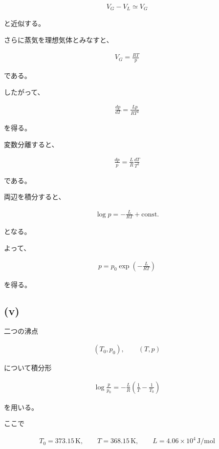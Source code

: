 \documentclass[platex,dvipdfmx,a4paper]{jsarticle}
\begin{document}
\begin{align*}
V_G-V_L
\simeq
V_G
\end{align*}

と近似する。

さらに蒸気を理想気体とみなすと、

\begin{align*}
V_G
=
\frac{RT}{p}
\end{align*}

である。

したがって、

\begin{align*}
\frac{dp}{dT}
=
\frac{Lp}{RT^2}
\end{align*}

を得る。

変数分離すると、

\begin{align*}
\frac{dp}{p}
=
\frac{L}{R}
\frac{dT}{T^2}
\end{align*}

である。

両辺を積分すると、

\begin{align*}
\log p
=
-\frac{L}{RT}
+\mathrm{const.}
\end{align*}

となる。

よって、

\begin{align*}
p
=
p_0
\exp\left(
-\frac{L}{RT}
\right)
\end{align*}

を得る。

\subsection{(v)}

二つの沸点

\begin{align*}
(T_0,p_0),
\qquad
(T,p)
\end{align*}

について積分形

\begin{align*}
\log\frac{p}{p_0}
=
-\frac{L}{R}
\left(
\frac1T-\frac1{T_0}
\right)
\end{align*}

を用いる。

ここで

\begin{align*}
T_0
=
373.15\,\mathrm{K},
\qquad
T
=
368.15\,\mathrm{K},
\qquad
L
=
4.06\times10^4\,\mathrm{J/mol}
\end{align*}
\end{document}
